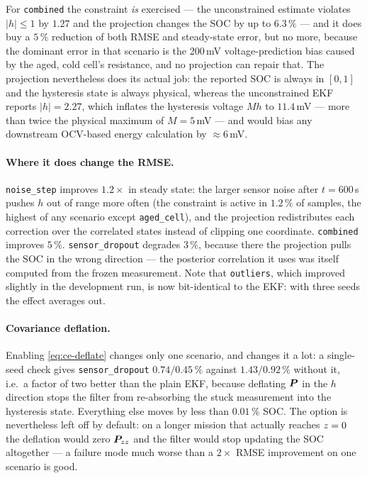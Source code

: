 For \texttt{combined} the constraint \emph{is} exercised --- the unconstrained estimate violates
$|h|\le1$ by $1.27$ and the projection changes the SOC by up to $6.3\,\%$ --- and it does buy a
$5\,\%$ reduction of both RMSE and steady-state error, but no more, because the dominant error in
that scenario is the 200\,mV voltage-prediction bias caused by the aged, cold cell's resistance,
and no projection can repair that.  The projection nevertheless does its actual job: the reported
SOC is always in $[0,1]$ and the hysteresis state is always physical, whereas the unconstrained EKF
reports $|h|=2.27$, which inflates the hysteresis voltage $Mh$ to $11.4$\,mV --- more than twice
the physical maximum of $M=5$\,mV --- and would bias any downstream OCV-based energy calculation by
$\approx6$\,mV.

\paragraph{Where it does change the RMSE.}  \texttt{noise\_step} improves $1.2\times$ in steady
state: the larger sensor noise after $t=600$\,s pushes $h$ out of range more often (the constraint
is active in $1.2\,\%$ of samples, the highest of any scenario except \texttt{aged\_cell}), and the
projection redistributes each correction over the correlated states instead of clipping one
coordinate.  \texttt{combined} improves $5\,\%$.  \texttt{sensor\_dropout} degrades $3\,\%$, because
there the projection pulls the SOC in the wrong direction --- the posterior correlation it uses was
itself computed from the frozen measurement.  Note that \texttt{outliers}, which improved slightly
in the development run, is now bit-identical to the EKF: with three seeds the effect averages out.

\paragraph{Covariance deflation.}  Enabling \eqref{eq:ce-deflate} changes only one scenario, and
changes it a lot: a single-seed check gives \texttt{sensor\_dropout} $0.74/0.45\,\%$ against
$1.43/0.92\,\%$ without it, i.e.\ a factor of two better than the plain EKF, because deflating $\bm{P}$
in the $h$ direction stops the filter from re-absorbing the stuck measurement into the hysteresis
state.  Everything else moves by less than $0.01\,\%$ SOC.  The option is nevertheless left off by
default: on a longer mission that actually reaches $z=0$ the deflation would zero
$\bm{P}_{zz}$ and the filter would stop updating the SOC altogether --- a failure mode much
worse than a $2\times$ RMSE improvement on one scenario is good.

